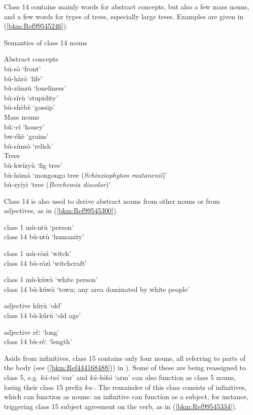 Class 14 contains mainly words for abstract concepts, but also a few mass nouns, and a few words for types of trees, especially large trees. Examples are given in (\ref{bkm:Ref99545246}).

\ea
\label{bkm:Ref99545246}
  Semantics of class 14 nouns

\ea Abstract concepts \\
bú-sò \tab ‘front’\\
bù-hârò \tab ‘life’\\
bù-zûnzù \tab ‘loneliness’\\
bù-sîrù \tab ‘stupidity’\\
bù-shèbè \tab ‘gossip’\\
\ex Mass nouns \\
bûː-cì \tab ‘honey’\\
bw-ékè \tab ‘grains’\\
bù-sùnsò \tab ‘relish’\\
\ex Trees \\
bù-kwízyù \tab ‘fig tree’\\
bù-hómà \tab ‘mongongo tree (\textit{Schinziophyton rautanenii})’\\
bù-zyíyì \tab ‘tree (\textit{Berchemia discolor})’\\
\z\z

Class 14 is also used to derive abstract nouns from other nouns or from adjectives, as in (\ref{bkm:Ref99545300}).

\ea
\label{bkm:Ref99545300}

\ea
class 1    mù-ntù    ‘person’\\
class 14  bù-ntù    ‘humanity’

\ex
class 1    mù-ròzì    ‘witch’\\
class 14  bù-ròzì    ‘witchcraft’

\ex
class 1    mù-kúwà    ‘white person’\\
class 14  bù-kúwà    ‘town; any area dominated by white people’

\ex
  adjective  kûrù      ‘old’\\
class 14  bù-kûrù    ‘old age’

\ex
  adjective  rêː      ‘long’\\
class 14  bù-rêː      ‘length’
\z\z

Aside from infinitives, class 15 contains only four nouns, all referring to parts of the body (see (\ref{bkm:Ref444168488})) in ). Some of these are being reassigned to class 5, e.g. \textit{kú-twì} ‘ear’ and \textit{kù-bôkò} ‘arm’ can also function as class 5 nouns, losing their class 15 prefix \textit{ku-}. The remainder of this class consists of infinitives, which can function as nouns: an infinitive can function as a subject, for instance, triggering class 15 subject agreement on the verb, as in (\ref{bkm:Ref99545334}).

